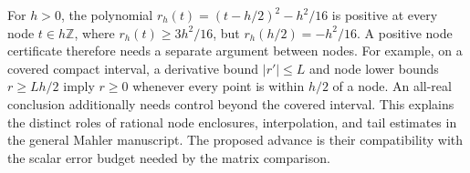 \begin{example}
For $h>0$, the polynomial
$r_h(t)=(t-h/2)^2-h^2/16$ is positive at every node $t\in h\mathbb Z$,
where $r_h(t)\ge3h^2/16$, but $r_h(h/2)=-h^2/16$.
A positive node certificate therefore needs a separate argument between
nodes. For example, on a covered compact interval, a derivative bound
$|r'|\le L$ and node lower bounds $r\ge Lh/2$ imply $r\ge0$ whenever
every point is within $h/2$ of a node. An all-real conclusion additionally
needs control beyond the covered interval. This explains the distinct
roles of rational node enclosures, interpolation, and tail estimates in
the general Mahler manuscript. The proposed advance is their compatibility
with the scalar error budget needed by the matrix comparison.
\end{example}
